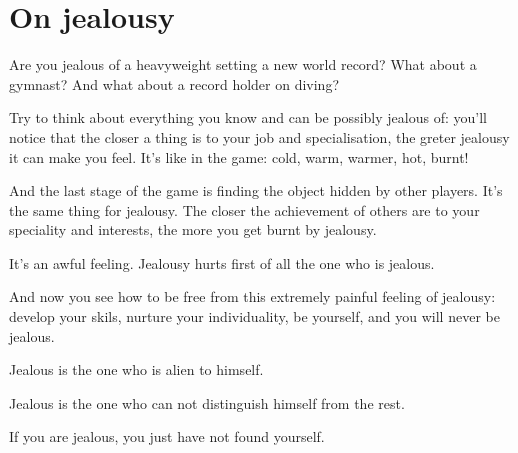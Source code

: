 \chapter{On jealousy}

Are you jealous of a heavyweight setting a new world record? What about a gymnast? And what about a record holder on diving?

Try to think about everything you know and can be possibly jealous of: you'll notice that the closer a thing is to your job and specialisation, the greter jealousy it can make you feel. It's like in the game: cold, warm, warmer, hot, burnt!

And the last stage of the game is finding the object hidden by other players. It's the same thing for jealousy. The closer the achievement of others are to your speciality and interests, the more you get burnt by jealousy.

It's an awful feeling. Jealousy hurts first of all the one who is jealous.

And now you see how to be free from this extremely painful feeling of jealousy: develop your skils, nurture your individuality, be yourself, and you will never be jealous.

Jealous is the one who is alien to himself.

Jealous is the one who can not distinguish himself from the rest.

If you are jealous, you just have not found yourself.